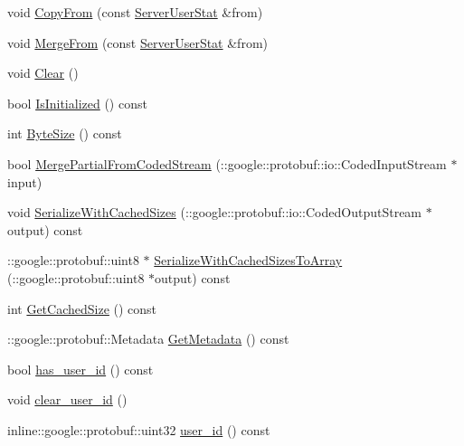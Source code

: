 \begin{DoxyCompactItemize}
void \hyperlink{class_i_m_1_1_base_define_1_1_server_user_stat_ac8e62e5fee692e488885cfcc82855b24}{Copy\+From} (const \hyperlink{class_i_m_1_1_base_define_1_1_server_user_stat}{Server\+User\+Stat} \&from)
\item 
void \hyperlink{class_i_m_1_1_base_define_1_1_server_user_stat_aaf68cbadbc03a15801b7da5fa5f13273}{Merge\+From} (const \hyperlink{class_i_m_1_1_base_define_1_1_server_user_stat}{Server\+User\+Stat} \&from)
\item 
void \hyperlink{class_i_m_1_1_base_define_1_1_server_user_stat_a27a1c392ac907cd373f8a13c13f72f2d}{Clear} ()
\item 
bool \hyperlink{class_i_m_1_1_base_define_1_1_server_user_stat_aaaedd90c22720b060dfa43988db24e24}{Is\+Initialized} () const 
\item 
int \hyperlink{class_i_m_1_1_base_define_1_1_server_user_stat_abbf26899ca798c24f373e996acbd948e}{Byte\+Size} () const 
\item 
bool \hyperlink{class_i_m_1_1_base_define_1_1_server_user_stat_a5c6e27d4f22a6ae70f6bcb702281a9a6}{Merge\+Partial\+From\+Coded\+Stream} (\+::google\+::protobuf\+::io\+::\+Coded\+Input\+Stream $\ast$input)
\item 
void \hyperlink{class_i_m_1_1_base_define_1_1_server_user_stat_af137a25d5f19514feec30405d81862e5}{Serialize\+With\+Cached\+Sizes} (\+::google\+::protobuf\+::io\+::\+Coded\+Output\+Stream $\ast$output) const 
\item 
\+::google\+::protobuf\+::uint8 $\ast$ \hyperlink{class_i_m_1_1_base_define_1_1_server_user_stat_a46748c7534703a5c28a8043904265a8e}{Serialize\+With\+Cached\+Sizes\+To\+Array} (\+::google\+::protobuf\+::uint8 $\ast$output) const 
\item 
int \hyperlink{class_i_m_1_1_base_define_1_1_server_user_stat_af1da7edf7d6ef5313ccbe5720d58053c}{Get\+Cached\+Size} () const 
\item 
\+::google\+::protobuf\+::\+Metadata \hyperlink{class_i_m_1_1_base_define_1_1_server_user_stat_a40b013a2dbbe4c9b37778729de2999c2}{Get\+Metadata} () const 
\item 
bool \hyperlink{class_i_m_1_1_base_define_1_1_server_user_stat_a333ce9ca3dae228a390eb8c557a5476e}{has\+\_\+user\+\_\+id} () const 
\item 
void \hyperlink{class_i_m_1_1_base_define_1_1_server_user_stat_aa18d557cd8c570707eb74e7c86e68657}{clear\+\_\+user\+\_\+id} ()
\item 
inline\+::google\+::protobuf\+::uint32 \hyperlink{class_i_m_1_1_base_define_1_1_server_user_stat_a4326904c59f4e50c7590ac55c19416b8}{user\+\_\+id} () const 

\end{DoxyCompactItemize}
